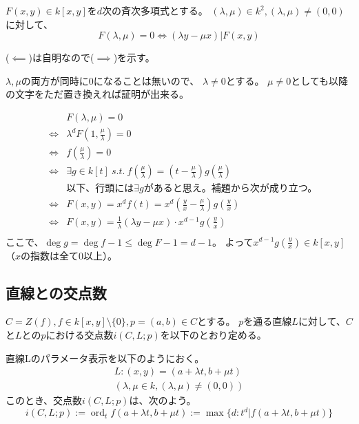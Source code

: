 \documentclass[a4]{article}
\begin{document}
        \begin{Prop}
            $F(x, y) \in k[x,y]$を$d$次の斉次多項式とする。
            $(\lambda, \mu) \in k^2, (\lambda, \mu) \neq (0, 0)$に対して、
            \[
                F(\lambda, \mu)=0 \iff (\lambda y -\mu x) | F(x, y)
            \]
        \end{Prop}
        \begin{Proof}
            ($\impliedby$)は自明なので($\implies$)を示す。

            $\lambda, \mu$の両方が同時に0になることは無いので、
            $\lambda \neq 0$とする。
            $\mu \neq 0$としても以降の文字をただ置き換えれば証明が出来る。

            \begin{eqnarray*}
                &{}& F\left(\lambda, \mu\right)=0 \\
                &\iff& \lambda^{d} F\left(1, \frac{\mu}{\lambda}\right)=0 \\
                &\iff& f\left(\frac{\mu}{\lambda}\right)=0 \\
                &\iff& \exists g \in k[t] ~s.t.~
                    f\left(\frac{\mu}{\lambda}\right) = \left(t-\frac{\mu}{\lambda}\right) g\left(\frac{\mu}{\lambda}\right) \\
                &{}&\mbox{以下、行頭には$\exists g$があると思え。補題から次が成り立つ。} \\
                &\iff& F(x, y)=x^d f(t)=x^d \left(\frac{y}{x}-\frac{\mu}{\lambda}\right) g\left(\frac{y}{x}\right) \\
                &\iff& F(x, y)=\frac{1}{\lambda} (\lambda y - \mu x)\cdot x^{d-1}g\left(\frac{y}{x}\right) \\
            \end{eqnarray*}
            ここで、$\deg g = \deg f -1 \leq \deg F -1 =d-1$。
            よって$x^{d-1}g\left(\frac{y}{x}\right) \in k[x, y]$（$x$の指数は全て0以上）。

            \QED
        \end{Proof}

        \subsection{直線との交点数}
        $C=Z(f), f \in k[x, y] \setminus \{0\}, p=(a, b) \in C$とする。
        $p$を通る直線$L$に対して、$C$と$L$との$p$における交点数$i(C, L; p)$を以下のとおり定める。
        
        \begin{Def}
            直線Lのパラメータ表示を以下のようにおく。
            \begin{gather*}
                L: (x, y)=(a+ \lambda t, b+ \mu t) \\
                (\lambda, \mu \in k, (\lambda, \mu) \neq (0, 0))
            \end{gather*}
            このとき、交点数$i(C, L; p)$は、次のよう。
            \[
                i(C, L; p)
                  :=\operatorname{ord}_{t} f(a+ \lambda t, b+ \mu t)
                  :=\max \{d : t^d | f(a+ \lambda t, b+ \mu t) \}
            \]
        \end{Def}
        
\end{document}

